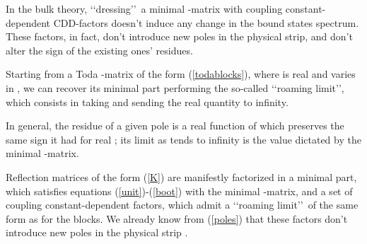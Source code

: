 \documentclass[a4paper,12pt]{report}
\begin{document}
In the bulk theory, \lq\lq dressing\rq\rq \, a minimal \coordHE{}-matrix with coupling constant-dependent CDD-factors
doesn't induce any change in the bound states spectrum. These factors, in fact, don't introduce new poles in the
physical strip, and don't alter the sign of the existing ones' residues.

Starting from a Toda \coordHE{}-matrix of the form (\ref{todablocks}), where \coordHE{} is real and varies in \myHighlight{$[0,2]$}\coordHE{}, we can
recover its minimal part performing the so-called \lq\lq roaming limit\rq\rq, which consists in taking \coordHE{}
and sending the real quantity \coordHE{} to infinity.

In general, the residue of a given pole is a real function of \coordHE{} which preserves the same sign it had for real
\coordHE{}; its limit as \coordHE{} tends to infinity is the value dictated by the minimal \coordHE{}-matrix.

Reflection matrices of the form (\ref{K}) are manifestly factorized in a minimal part, which satisfies equations
(\ref{unit})-(\ref{boot}) with the minimal \coordHE{}-matrix, and a set of coupling constant-dependent factors, which
admit a \lq\lq roaming limit\rq\rq \, of the same form as for the \coordHE{} blocks. We already know from
(\ref{poles}) that these factors don't introduce new poles in the physical strip \coordHE{}.
\end{document}
